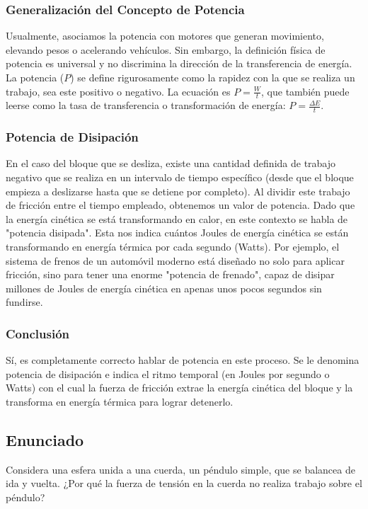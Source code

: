 \documentclass[a4paper,12pt]{article}
\begin{document}
\subsubsection*{Generalización del Concepto de Potencia}
Usualmente, asociamos la potencia con motores que generan movimiento, elevando pesos o acelerando vehículos. Sin embargo, la definición física de potencia es universal y no discrimina la dirección de la transferencia de energía. La potencia ($P$) se define rigurosamente como la rapidez con la que se realiza un trabajo, sea este positivo o negativo. La ecuación es $P = \frac{W}{t}$, que también puede leerse como la tasa de transferencia o transformación de energía: $P = \frac{\Delta E}{t}$.

\subsubsection*{Potencia de Disipación}
En el caso del bloque que se desliza, existe una cantidad definida de trabajo negativo que se realiza en un intervalo de tiempo específico (desde que el bloque empieza a deslizarse hasta que se detiene por completo). Al dividir este trabajo de fricción entre el tiempo empleado, obtenemos un valor de potencia.
Dado que la energía cinética se está transformando en calor, en este contexto se habla de "potencia disipada". Esta nos indica cuántos Joules de energía cinética se están transformando en energía térmica por cada segundo (Watts). Por ejemplo, el sistema de frenos de un automóvil moderno está diseñado no solo para aplicar fricción, sino para tener una enorme "potencia de frenado", capaz de disipar millones de Joules de energía cinética en apenas unos pocos segundos sin fundirse.

\subsubsection*{Conclusión}
Sí, es completamente correcto hablar de potencia en este proceso. Se le denomina potencia de disipación e indica el ritmo temporal (en Joules por segundo o Watts) con el cual la fuerza de fricción extrae la energía cinética del bloque y la transforma en energía térmica para lograr detenerlo.

\newpage

\subsection*{Enunciado}
Considera una esfera unida a una cuerda, un péndulo simple, que se balancea de ida y vuelta.
¿Por qué la fuerza de tensión en la cuerda no realiza trabajo sobre el péndulo?
\end{document}
